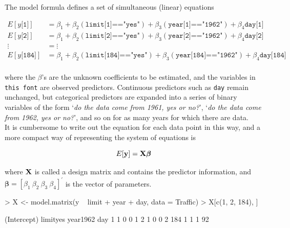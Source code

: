 \documentclass{article}
\begin{document}
The model formula defines a set of simultaneous (linear) equations 

\begin{displaymath}
\begin{array}{cl}
E[y\texttt{[1]}] &=\beta_{1}+\beta_{2}(\texttt{limit[1]=="yes"})+\beta_{3}(\texttt{year[1]=="1962"})+\beta_{4}\texttt{day[1]}\\
E[y\texttt{[2]}] &= \beta_{1}+\beta_{2}(\texttt{limit[2]=="yes"})+\beta_{3}(\texttt{year[2]=="1962"})+\beta_{4}\texttt{day[2]}\\
\vdots&=\vdots\\
E[y\texttt{[184]}] &= \beta_{1}+\beta_{2}(\texttt{limit[184]=="yes"})+\beta_{3}(\texttt{year[184]=="1962"})+\beta_{4}\texttt{day[184]}\\
\end{array}
\label{SE-eq}
\end{displaymath}

where the $\beta$'s are the unknown coefficients to be estimated, and the variables in \texttt{this font} are observed predictors. Continuous predictors such as \texttt{day} remain unchanged, but categorical predictors are expanded into a series of binary variables of the form `\emph{do the data come from 1961, yes or no?}', `\emph{do the data come from 1962, yes or no?}', and so on for as many years for which there are data.\\ 

It is cumbersome to write out the equation for each data point in this way, and a more compact way of representing the system of equations is

\begin{equation}
E[{\bf y}] = {\bf X}{\bm \beta}
\label{lm-eq}
\end{equation}	

where ${\bf X}$ is called a design matrix and contains the predictor information, and ${\bm \beta} = [\beta_{1}\ \beta_{2}\ \beta_{3}\ \beta_{4}]^{'}$ is the vector of parameters. 

\begin{Schunk}
\begin{Sinput}
> X <- model.matrix(y ~ limit + year + day, data = Traffic)
> X[c(1, 2, 184), ]
\end{Sinput}
\begin{Soutput}
    (Intercept) limityes year1962 day
1             1        0        0   1
2             1        0        0   2
184           1        1        1  92
\end{Soutput}
\end{Schunk}
\end{document}
